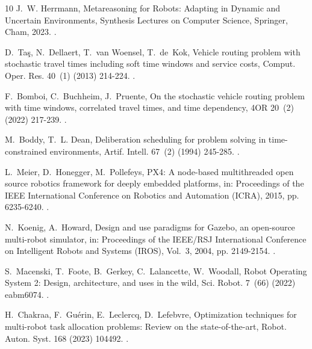 \documentclass[a4paper,fleqn]{cas-dc}
\begin{document}
\begin{thebibliography}{10}
J.~W. Herrmann, Metareasoning for Robots: Adapting in Dynamic and Uncertain
  Environments, Synthesis Lectures on Computer Science, Springer, Cham, 2023.
\newblock \href {https://doi.org/10.1007/978-3-031-32237-2}
  {}.

D.~Ta{\c{s}}, N.~Dellaert, T.~van Woensel, T.~de~Kok, Vehicle routing problem
  with stochastic travel times including soft time windows and service costs,
  Comput. Oper. Res. 40~(1) (2013) 214-224.
\newblock \href {https://doi.org/10.1016/j.cor.2012.06.008}
  {}.

F.~Bomboi, C.~Buchheim, J.~Pruente, On the stochastic vehicle routing problem
  with time windows, correlated travel times, and time dependency, 4OR 20~(2)
  (2022) 217-239.
\newblock \href {https://doi.org/10.1007/s10288-021-00476-z}
  {}.

M.~Boddy, T.~L. Dean, Deliberation scheduling for problem solving in
  time-constrained environments, Artif. Intell. 67~(2) (1994) 245-285.
\newblock \href {https://doi.org/10.1016/0004-3702(94)90054-X}
  {}.

L.~Meier, D.~Honegger, M.~Pollefeys, {PX4}: A node-based multithreaded open
  source robotics framework for deeply embedded platforms, in: Proceedings of
  the IEEE International Conference on Robotics and Automation (ICRA), 2015,
  pp. 6235-6240.
\newblock \href {https://doi.org/10.1109/ICRA.2015.7140074}
  {}.

N.~Koenig, A.~Howard, Design and use paradigms for {Gazebo}, an open-source
  multi-robot simulator, in: Proceedings of the IEEE/RSJ International
  Conference on Intelligent Robots and Systems (IROS), Vol.~3, 2004, pp.
  2149-2154.
\newblock \href {https://doi.org/10.1109/IROS.2004.1389727}
  {}.

S.~Macenski, T.~Foote, B.~Gerkey, C.~Lalancette, W.~Woodall, {Robot Operating
  System 2}: Design, architecture, and uses in the wild, Sci. Robot. 7~(66)
  (2022) eabm6074.
\newblock \href {https://doi.org/10.1126/scirobotics.abm6074}
  {}.

H.~Chakraa, F.~Gu{\'e}rin, E.~Leclercq, D.~Lefebvre, Optimization techniques
  for multi-robot task allocation problems: Review on the state-of-the-art,
  Robot. Auton. Syst. 168 (2023) 104492.
\newblock \href {https://doi.org/10.1016/j.robot.2023.104492}
  {}.


\end{thebibliography}
\end{document}
